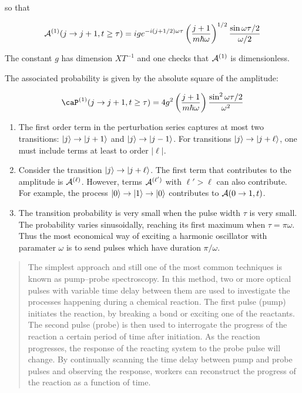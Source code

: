 so that

\begin{equation}
\mathcal{A}^{(1)}(j \to j+1, t\ge \tau) =
ig e^{-i(j+  1/2)\omega\tau}  \left(\frac{j+1}{m\hbar \omega}\right)^{1/2}\frac{ \sin \omega \tau/2}{\omega/2}
\end{equation}

\begin{remark}
The constant $g$ has dimension $XT^{-1}$ and one checks that $\mathcal{A}^{(1)}$ is dimensionless.
\end{remark}

The associated probability is given by the absolute square of the amplitude:

\begin{equation}
\caP^{(1)}(j \to j+1, t\ge \tau) =
4g^2  \left(\frac{j+1}{m\hbar \omega}\right)\frac{ \sin^2 \omega \tau/2}{\omega^2}
\end{equation}



\begin{enumerate}
\item The first order term in the perturbation series captures at most two transitions: $| j \rangle \to | j + 1 \rangle$ and  $| j \rangle \to | j- 1 \rangle$.  For transitions $| j \rangle \to | j + \ell \rangle$, one must include terms at least to order $|\ell|$.
%
\item Consider the transition  $| j \rangle \to | j + \ell \rangle$.  The first term that contributes to the amplitude is $\mathcal{A}^{(\ell)}$.  However, terms $\mathcal{A}^{(\ell')}$ with $\ell' > \ell$ can also contribute.  For example, the process $|0\rangle \to |1\rangle \to|0\rangle$ contributes to $\mathcal{A}(0 \to 1, t)$.
\item The transition probability is very small when the pulse width $\tau$ is very small.  The probability varies sinusoidally, reaching its first maximum when $\tau = \pi\omega$.  Thus the most economical way of exciting a harmonic oscillator with paramater $\omega$ is to send pulses which have duration $\pi/\omega$.
\end{enumerate}



\begin{quote}
The simplest approach and still one of the most common techniques is known as pump–probe spectroscopy. In this method, two or more optical pulses with variable time delay between them are used to investigate the processes happening during a chemical reaction. The first pulse (pump) initiates the reaction, by breaking a bond or exciting one of the reactants. The second pulse (probe) is then used to interrogate the progress of the reaction a certain period of time after initiation. As the reaction progresses, the response of the reacting system to the probe pulse will change. By continually scanning the time delay between pump and probe pulses and observing the response, workers can reconstruct the progress of the reaction as a function of time.
\end{quote}


